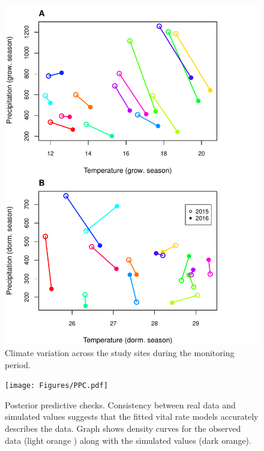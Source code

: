 \documentclass[12pt]{article}
\begin{document}
\begin{figure}[H]
		\centering
		\includegraphics[width=0.959\linewidth]{Figures/site_year_weather.pdf}
		\caption{Climate variation across the study sites during the monitoring period.}
		\label{Sup:climate_variation}
\end{figure}

	
\begin{figure}[H]
		\centering
		\texttt{[image: Figures/PPC.pdf]}
		\caption{Posterior predictive checks. Consistency between real data and simulated values suggests that the fitted vital rate models accurately describes the data. Graph shows density curves for the observed data (light orange ) along with the simulated values (dark orange).}
		\label{Sup:PPC}
	\end{figure}
\end{document}
